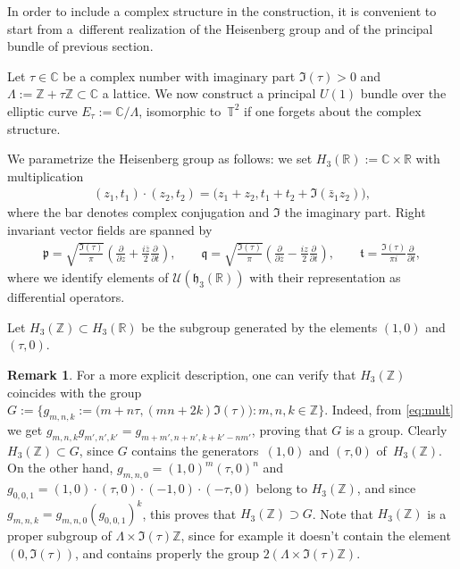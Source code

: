 \documentclass[10pt,a4paper]{amsart}
\numberwithin{equation}{section}
\theoremstyle{definition}
\newtheorem{rem}[thm]{Remark}
\newcommand{\U}{\mathcal{U}}
\newcommand{\R}{\mathbb{R}}
\newcommand{\C}{\mathbb{C}}
\newcommand{\Z}{\mathbb{Z}}
\newcommand{\T}{\mathbb{T}}
\newcommand{\mf}{\mathfrak}
\newcommand{\ga}{\mf{p}}
\newcommand{\gb}{\mf{q}}
\newcommand{\gc}{\mf{t}}
\begin{document}
In order to include a complex structure in the construction, it is convenient to start from a~dif\/ferent realization of the Heisenberg group and of the principal bundle of previous section.

Let $\tau\in\C$ be a complex number with imaginary part $\Im(\tau)>0$ and
$\Lambda:=\Z+\tau\Z\subset\C$ a lattice.
We now construct a principal $U(1)$ bundle over the elliptic curve $E_\tau:=\C/\Lambda$, isomorphic to~$\T^2$ if one forgets about the complex structure.

We parametrize the Heisenberg group as follows: we set $H_3(\R):=\C\times\R$ with multiplication
\begin{gather}\label{eq:mult}
(z_1,t_1)\cdot(z_2,t_2)=\big(z_1+z_2,t_1+t_2+\Im(\bar z_1z_2)\big),
\end{gather}
where the bar denotes complex conjugation and $\Im$ the imaginary part.
Right invariant vector f\/ields are spanned by
\begin{gather}\label{eq:rivf}
\ga=\sqrt{\frac{\Im(\tau)}{\pi}}\left(\frac{\partial}{\partial z}
+\frac{i\bar z}{2}\frac{\partial}{\partial t}
\right)
,\qquad
\gb=\sqrt{\frac{\Im(\tau)}{\pi}}
\left(\frac{\partial}{\partial\bar z}
-\frac{iz}{2}\frac{\partial}{\partial t}
\right)
,\qquad
\gc=\frac{\Im(\tau)}{\pi i}\frac{\partial}{\partial t}
,
\end{gather}
where we identify elements of $\U(\mf{h}_3(\R))$ with their representation as dif\/ferential operators.

Let $H_3(\Z)\subset H_3(\R)$ be the subgroup generated by the elements $(1,0)$ and $(\tau,0)$.

\begin{rem}
For a more explicit description, one can verify that $H_3(\Z)$
coincides with the group
$G:=\big\{g_{m,n,k}:=\big(m+n\tau,(mn+2k)\Im(\tau)\big)\colon m,n,k\in\Z\big\}$. Indeed, from \eqref{eq:mult} we get
$g_{m,n,k}g_{m',n',k'}=g_{m+m',n+n',k+k'-nm'}$, proving that $G$ is a group.
Clearly $H_3(\Z)\subset G$, since $G$ contains the generators~$(1,0)$ and $(\tau,0)$ of~$H_3(\Z)$.
On the other hand, $g_{m,n,0}=(1,0)^m(\tau,0)^n$ and
$g_{0,0,1}=(1,0)\cdot (\tau,0)\cdot (-1,0)\cdot (-\tau,0)$
belong to $H_3(\Z)$, and since $g_{m,n,k}=g_{m,n,0}(g_{0,0,1})^k$,
this proves that $H_3(\Z)\supset G$.
Note that $H_3(\Z)$ is a proper subgroup of $\Lambda\times \Im(\tau)\Z$, since for example it doesn't contain the element $(0,\Im(\tau))$, and contains properly the group $2(\Lambda\times \Im(\tau)\Z)$.
\end{rem}
\end{document}
